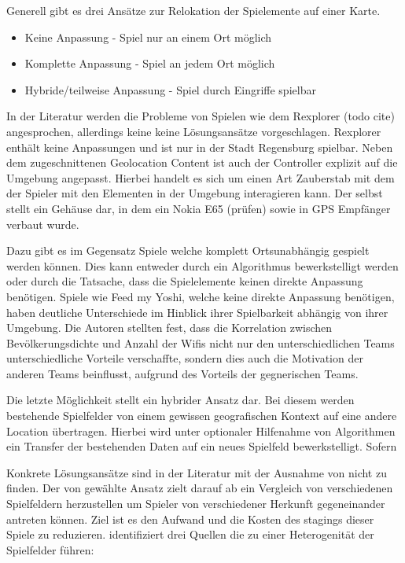 Generell gibt es drei Ansätze zur Relokation der Spielemente auf einer Karte.

\begin{itemize}
      \item Keine Anpassung - Spiel nur an einem Ort möglich
      \item Komplette Anpassung - Spiel an jedem Ort möglich
      \item Hybride/teilweise Anpassung - Spiel durch Eingriffe spielbar
\end{itemize}

In der Literatur werden die Probleme von Spielen wie dem Rexplorer (todo cite) angesprochen, allerdings keine keine Lösungsansätze vorgeschlagen. Rexplorer enthält keine Anpassungen und ist nur in der Stadt Regensburg spielbar. Neben dem zugeschnittenen Geolocation Content ist auch der Controller explizit auf die Umgebung angepasst.
Hierbei handelt es sich um einen Art Zauberstab mit dem der Spieler mit den Elementen in der Umgebung interagieren kann. Der selbst stellt ein Gehäuse dar, in dem ein Nokia E65 (prüfen) sowie in GPS Empfänger verbaut wurde.

Dazu gibt es im Gegensatz Spiele welche komplett Ortsunabhängig gespielt werden können.
Dies kann entweder durch ein Algorithmus bewerkstelligt werden oder durch die Tatsache, dass die Spielelemente keinen direkte Anpassung benötigen.
Spiele wie Feed my Yoshi, welche keine direkte Anpassung benötigen, haben deutliche Unterschiede im Hinblick ihrer Spielbarkeit abhängig von ihrer Umgebung. Die Autoren stellten fest, dass die Korrelation zwischen Bevölkerungsdichte und Anzahl der Wifis nicht nur den unterschiedlichen Teams unterschiedliche Vorteile verschaffte, sondern dies auch die Motivation der anderen Teams beinflusst, aufgrund des Vorteils der gegnerischen Teams.

Die letzte Möglichkeit stellt ein hybrider Ansatz dar. Bei diesem werden bestehende Spielfelder von einem gewissen geografischen Kontext auf eine andere Location übertragen. Hierbei wird unter optionaler Hilfenahme von Algorithmen ein Transfer der bestehenden Daten auf ein neues Spielfeld bewerkstelligt. Sofern

Konkrete Lösungsansätze sind in der Literatur mit der Ausnahme von \cite{PeterKiefer.2007}
nicht zu finden.
Der von \cite{PeterKiefer.2007} gewählte Ansatz zielt darauf ab ein Vergleich von verschiedenen Spielfeldern herzustellen um Spieler von verschiedener Herkunft gegeneinander antreten können. Ziel ist es den Aufwand und die Kosten des stagings dieser Spiele zu reduzieren. \citep{PeterKiefer.2007} identifiziert drei Quellen die zu einer Heterogenität der Spielfelder führen:

